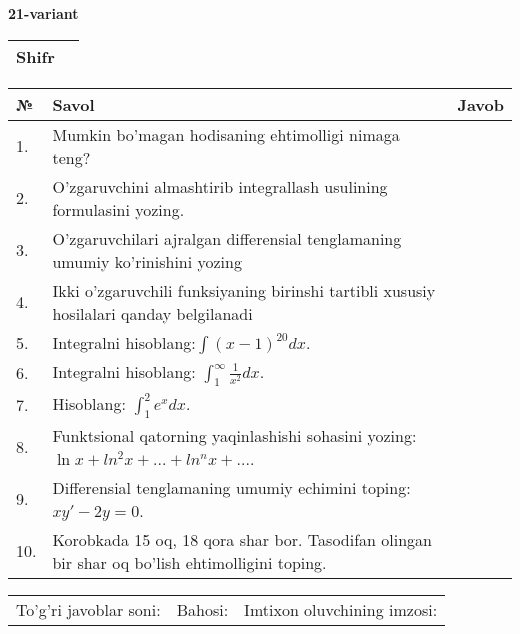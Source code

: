 \documentclass{article}
\begin{document}
  \egroup
  
  \newpage
  
  
  \textbf{21-variant}\\
  
  \bgroup
  \def\arraystretch{1.6} %
  
  \begin{tabular}{|m{5.7cm}|m{9.5cm}|}
  \hline
  Shifr & \\
  \hline
  \end{tabular}
  
  \vspace{1cm}
  
  \begin{tabular}{|m{0.7cm}|m{10cm}|m{4cm}|}
  \hline
  № & Savol & Javob \\
  \hline
  1. & Mumkin bo'magan hodisaning ehtimolligi nimaga teng? &  \\
  \hline
  2. & O'zgaruvchini almashtirib integrallash usulining formulasini yozing. &  \\
  \hline
  3. & O'zgaruvchilari ajralgan differensial tenglamaning umumiy ko'rinishini yozing &  \\
  \hline
  4. & Ikki o'zgaruvchili funksiyaning birinshi tartibli xususiy hosilalari qanday belgilanadi &  \\
  \hline
  5. & Integralni hisoblang:\(\int {(x - 1)^{20}}dx\). &  \\
  \hline
  6. & Integralni hisoblang: \(\int_{1}^{\infty}{\frac{1}{x^{2}}dx}\). &  \\
  \hline
  7. & Hisoblang: \(\int_{1}^{2}{e^{x}dx}\). &  \\
  \hline
  8. & Funktsional qatorning yaqinlashishi sohasini yozing: \(\ln x + ln^{2}x + ... + ln^{n}x + ...\). &  \\
  \hline
  9. & Differensial tenglamaning umumiy echimini toping: \(xy' - 2y = 0\). &  \\
  \hline
  10. & Korobkada 15 oq, 18 qora shar bor. Tasodifan olingan bir shar oq bo'lish ehtimolligini toping. &  \\
  \hline
  \end{tabular}
  
  \vspace{1cm}
  
  \begin{tabular}{lll}
  To'g'ri javoblar soni: \underline{\hspace{1.5cm}} & 
  Bahosi: \underline{\hspace{1.5cm}} & 
  Imtixon oluvchining imzosi: \underline{\hspace{2cm}} \\
  \end{tabular}
  
\end{document}
